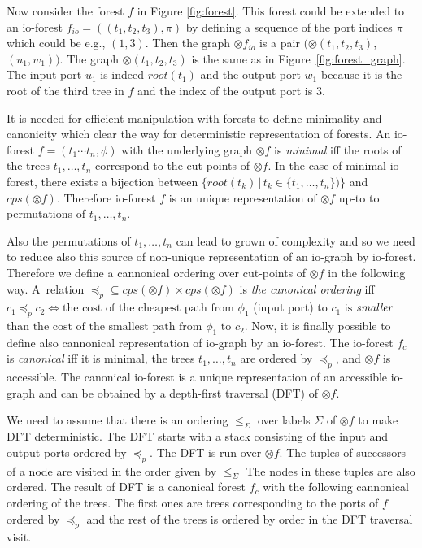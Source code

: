 \documentclass[a4paper, 12pt]{article}
\begin{document}
Now consider the forest $f$ in Figure \ref{fig:forest}.
This forest could be extended to an io-forest $f_{io}=((t_1,t_2,t_3),\pi)$ 
by defining a sequence of the port indices $\pi$ which could be e.g., $(1,3)$.
Then the graph $\otimes f_{io}$ is a pair $(\otimes (t_1,t_2,t_3)$, $(u_1,w_1))$.
The graph $\otimes (t_1,t_2,t_3)$ is the same as in Figure~\ref{fig:forest_graph}.
The input port $u_1$ is indeed $root(t_1)$
and the output port $w_1$ because it is the root of the third tree in $f$
and the index of the output port is $3$.
\label{ex:iograph}
\eexmp


It is needed for efficient manipulation with forests to define minimality and
canonicity which clear the way for deterministic representation of forests.
An io-forest $f=(t_1 \cdots t_n, \phi)$ with the underlying graph $\otimes f$ is \emph{minimal}
iff the roots of the trees $t_1,\ldots,t_n$ correspond to the cut-points of $\otimes f$.
In the case of minimal io-forest, there exists a bijection between
$\{root(t_k)\,|\, t_k \in \{t_1, \ldots, t_n\} )\}$ and $cps(\otimes f)$.
Therefore io-forest $f$ is an unique representation of $\otimes f$ up-to to permutations of $t_1,\ldots,t_n$.

Also the permutations of $t_1,\ldots,t_n$ can lead to grown of complexity and so
we need to reduce also this source of non-unique representation of an io-graph by io-forest.
Therefore we define a cannonical ordering over cut-points of $\otimes f$ in the following way.
A~relation ${\preceq_p} \subseteq {cps(\otimes f) \times cps(\otimes f)}$ is \emph{the canonical ordering}
iff $c_1 \preceq_p c_2 \Leftrightarrow \text{the cost of the cheapest path from }
\phi_1$ (input port) to $c_1 \text{ is}$ $\emph{smaller}$ $\text{than the cost of the smallest path from } \phi_1 \text{ to } c_2$.
Now, it is finally possible to define also cannonical representation of io-graph by an io-forest.
The io-forest $f_c$ is \emph{canonical} iff it is minimal, the trees $t_1,\ldots, t_n$ are ordered by $\preceq_p$, and $\otimes f$ is accessible.
The canonical io-forest is a unique representation of an accessible io-graph
and can be obtained by a depth-first traversal (DFT) of $\otimes f$.

We need to assume that there is an ordering $\leq_\Sigma$ over labels $\Sigma$ of $\otimes f$
to make DFT deterministic.
The DFT starts with a stack consisting of the input and output ports ordered by $\preceq_p$.
The DFT is run over $\otimes f$.
The tuples of successors of a node are visited in the order given by $\leq_{\Sigma}$
The nodes in these tuples are also ordered.
The result of DFT is a canonical forest $f_c$ with the following
cannonical ordering of the trees.
The first ones are trees corresponding to the ports of $f$ ordered by $\preceq_p$ and
the rest of the trees is ordered by order in the DFT traversal visit.
\end{document}
